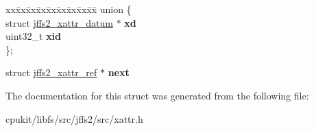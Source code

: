 \begin{DoxyCompactItemize}
\begin{tabbing}
\end{tabbing}\item 
\mbox{\label{structjffs2__xattr__ref_a7a5c13f816f3e174082369d13b270c9e}} 
\begin{tabbing}
xx\=xx\=xx\=xx\=xx\=xx\=xx\=xx\=xx\=\kill
union \{\\
\>struct \mbox{\hyperlink{structjffs2__xattr__datum}{jffs2\_xattr\_datum}} $\ast$ {\bfseries xd}\\
\>uint32\_t {\bfseries xid}\\
\}; \\

\end{tabbing}\item 
\mbox{\label{structjffs2__xattr__ref_a1bf9bbd74c6bfd92141a78986e4de981}} 
struct \mbox{\hyperlink{structjffs2__xattr__ref}{jffs2\+\_\+xattr\+\_\+ref}} $\ast$ {\bfseries next}
\end{DoxyCompactItemize}


The documentation for this struct was generated from the following file\+:\begin{DoxyCompactItemize}
\item 
cpukit/libfs/src/jffs2/src/xattr.\+h\end{DoxyCompactItemize}
